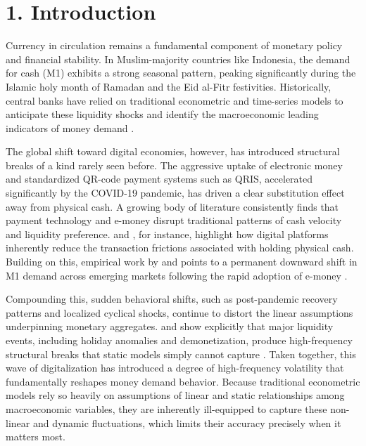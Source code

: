 \documentclass[12pt, letterpaper]{article}
\begin{document}
\newpage

\section*{1. Introduction}
Currency in circulation remains a fundamental component of monetary policy and financial stability. In Muslim-majority countries like Indonesia, the demand for cash (M1) exhibits a strong seasonal pattern, peaking significantly during the Islamic holy month of Ramadan and the Eid al-Fitr festivities. Historically, central banks have relied on traditional econometric and time-series models to anticipate these liquidity shocks and identify the macroeconomic leading indicators of money demand \citep{Suroso2025, Glova2025, Claussen2026}.

The global shift toward digital economies, however, has introduced structural breaks of a kind rarely seen before. The aggressive uptake of electronic money and standardized QR-code payment systems such as QRIS, accelerated significantly by the COVID-19 pandemic, has driven a clear substitution effect away from physical cash. A growing body of literature consistently finds that payment technology and e-money disrupt traditional patterns of cash velocity and liquidity preference. \citet{Verdier2024} and \citet{Lagos2022}, for instance, highlight how digital platforms inherently reduce the transaction frictions associated with holding physical cash. Building on this, empirical work by \citet{Awasthy2022} and \citet{Komurcuoglu2024} points to a permanent downward shift in M1 demand across emerging markets following the rapid adoption of e-money \citep{Bhattacharya2016, Raj2020, Marmora2021, Ogachi2021}.

Compounding this, sudden behavioral shifts, such as post-pandemic recovery patterns and localized cyclical shocks, continue to distort the linear assumptions underpinning monetary aggregates. \citet{Singh2022} and \citet{Dutta2024} show explicitly that major liquidity events, including holiday anomalies and demonetization, produce high-frequency structural breaks that static models simply cannot capture \citep{Bhattacharya2018, Ramesh2025, Chaudhry2026, HernandezDelvalle2024}. Taken together, this wave of digitalization has introduced a degree of high-frequency volatility that fundamentally reshapes money demand behavior. Because traditional econometric models rely so heavily on assumptions of linear and static relationships among macroeconomic variables, they are inherently ill-equipped to capture these non-linear and dynamic fluctuations, which limits their accuracy precisely when it matters most.
\end{document}

